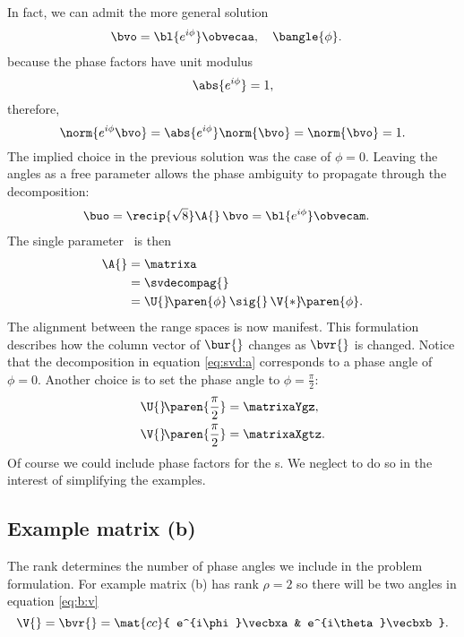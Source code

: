 In fact, we can admit the more general solution
\begin{equation}
  \begin{split}
    \bvo  &= {\bl{ e^{i\phi} }}\obvecaa, \quad \bangle{\phi}.
  \end{split}
\end{equation}
because the phase factors have unit modulus
\begin{equation}
  \abs{e^{i\phi}} = 1,
\end{equation}
therefore,
\begin{equation}
  \norm{e^{i\phi} \bvo} = \abs{e^{i\phi}} \norm{\bvo} = \norm{\bvo} = 1.
\end{equation}
The implied choice in the previous solution was the case of $\phi = 0$. Leaving the angles as a free parameter allows the phase ambiguity to propagate through the decomposition:
\begin{equation}
  \begin{split}
    \buo &= \recip{\sqrt{8}} \A{}\, \bvo = {\bl{e^{i\phi}}} \obvecam .
  \end{split}
\end{equation}
The single parameter \asvd \ is then
\begin{equation}
  \begin{split}
    \A{} 
      &= \matrixa \\
      &= \svdecompag{} \\
      &= \U{}\!\paren{\phi} \, \sig{}\, \V{*}\!\paren{\phi}. 
  \end{split}
\end{equation}
The alignment between the range spaces is now manifest. This formulation describes how the column vector of $\bur{}$ changes as $\bvr{}$ is changed. Notice that the decomposition in equation \eqref{eq:svd:a} corresponds to a phase angle of $\phi = 0$.
Another choice is to set the phase angle to $\phi = \frac{\pi}{2}$:
\begin{equation}
  \begin{split}
    \U{}\!\paren{\frac{\pi}{2} } &= \matrixaYgz, \\
    \V{}\!\paren{\frac{\pi}{2} } &= \matrixaXgtz.
  \end{split}
\end{equation}
Of course we could include phase factors for the \ns s. We neglect to do so in the interest of simplifying the examples.

\subsection{Example matrix (b)}
The rank determines the number of phase angles we include in the problem formulation. For example matrix (b) has rank $\rho=2$ so there will be two angles in equation \eqref{eq:b:v}
\begin{equation}
  \V{} = \bvr{} = \mat{cc}{ e^{i\phi}\vecbxa &  e^{i\theta}\vecbxb }.
  \label{eq:phase:example b:v}
\end{equation}


